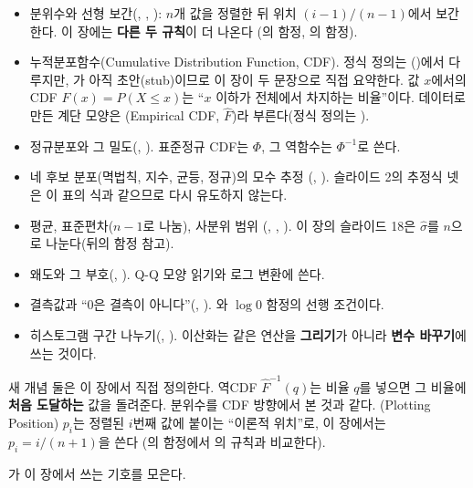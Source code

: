 \begin{itemize}
  \item 분위수와 선형 보간(, ,
        ): $n$개 값을 정렬한 뒤 위치 $(i-1)/(n-1)$에서
        보간한다. 이 장에는 \textbf{다른 두 규칙}이 더 나온다
        (의 함정, 의 함정).
  \item 누적분포함수(Cumulative Distribution Function, CDF). 정식 정의는
        ()에서 다루지만, 가
        아직 초안(stub)이므로 이 장이 두 문장으로 직접 요약한다. 값 $x$에서의
        CDF $F(x) = P(X \le x)$는 ``$x$ 이하가 전체에서 차지하는 비율''이다.
        데이터로 만든 계단 모양은 (Empirical CDF,
        $\hat F$)라 부른다(정식 정의는 ).
  \item 정규분포와 그 밀도(, ). 표준정규
        CDF는 $\Phi$, 그 역함수는 $\Phi^{-1}$로 쓴다.
  \item 네 후보 분포(멱법칙, 지수, 균등, 정규)의 모수 추정
        (, ). 슬라이드 2의
        추정식 넷은 이 표의 식과 같으므로 다시 유도하지 않는다.
  \item 평균, 표준편차($n-1$로 나눔), 사분위 범위
        (, , ). 이 장의
        슬라이드 18은 $\hat\sigma$를 $n$으로 나눈다(뒤의 함정 참고).
  \item 왜도와 그 부호(, ). Q-Q 모양
        읽기와 로그 변환에 쓴다.
  \item 결측값과 ``0은 결측이 아니다''(,
        ). 와 $\log 0$ 함정의
        선행 조건이다.
  \item 히스토그램 구간 나누기(, ).
        이산화는 같은 연산을 \textbf{그리기}가 아니라 \textbf{변수
        바꾸기}에 쓰는 것이다.
\end{itemize}

새 개념 둘은 이 장에서 직접 정의한다. 역CDF $\hat F^{-1}(q)$는 비율 $q$를
넣으면 그 비율에 \textbf{처음 도달하는} 값을 돌려준다. 분위수를 CDF
방향에서 본 것과 같다. (Plotting Position) $p_i$는 정렬된
$i$번째 값에 붙이는 ``이론적 위치''로, 이 장에서는 $p_i = i/(n+1)$을 쓴다
(의 함정에서 의 규칙과 비교한다).

가 이 장에서 쓰는 기호를 모은다.


